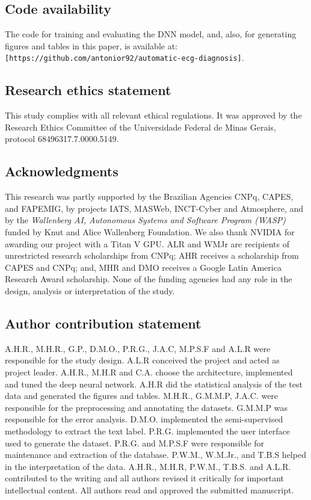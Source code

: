 \documentclass{article}
\begin{document}
\subsection*{Code availability} The code for  training and evaluating the DNN model, and, also, for generating figures and tables in this paper, is available at: \verb|[https://github.com/antonior92/automatic-ecg-diagnosis]|. 

\subsection*{Research ethics statement} This study complies with all relevant ethical regulations. It was approved by the Research Ethics Committee of the Universidade Federal de Minas Gerais, protocol 68496317.7.0000.5149.


\subsection*{Acknowledgments}
This research was partly supported by the Brazilian Agencies CNPq, CAPES, and FAPEMIG, by projects IATS, MASWeb, INCT-Cyber and Atmosphere, and by the \emph{Wallenberg AI, Autonomous Systems and Software Program (WASP)} funded by Knut and Alice Wallenberg Foundation. We also thank NVIDIA for awarding our project with a Titan V GPU. ALR and WMJr are recipients of unrestricted research scholarships from CNPq; AHR receives a scholarship from CAPES and CNPq; and, MHR and DMO receives a Google Latin America Research Award scholarship. None of the funding agencies had any role in the design, analysis or interpretation of the study.



\subsection*{Author contribution statement}
A.H.R., M.H.R., G.P., D.M.O., P.R.G., J.A.C, M.P.S.F and A.L.R were responsible for the study design. A.L.R conceived the project and acted as project leader. A.H.R., M.H.R and C.A.  choose the architecture, implemented and tuned the deep neural network. A.H.R did the statistical analysis of the test data and generated the figures and tables. M.H.R., G.M.M.P, J.A.C. were responsible for the preprocessing and annotating the datasets. G.M.M.P was responsible for the error analysis. D.M.O. implemented the semi-supervised methodology to extract the text label. P.R.G. implemented the user interface used to generate the dataset. P.R.G. and M.P.S.F were responsible for maintenance and extraction of the database.  P.W.M., W.M.Jr., and T.B.S helped in the interpretation of the data. A.H.R., M.H.R, P.W.M., T.B.S. and A.L.R. contributed to the writing and all authors revised it critically for important intellectual content. All authors read and approved the submitted manuscript.
\end{document}
